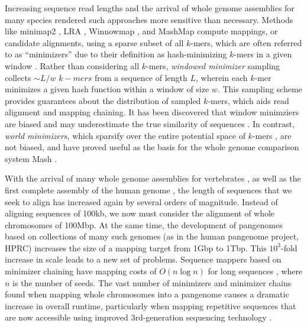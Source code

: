 \documentclass{bioinfo}
\theoremstyle{definition}
\begin{document}
Increasing sequence read lengths and the arrival of whole genome assemblies for many species rendered such approaches more sensitive than necessary.
Methods like minimap2 \citep{Li_2018}, LRA \citep{Ren_2021}, Winnowmap \citep{Jain_2020}, and MashMap \citep{Jain_2018} compute mappings, or candidate alignments, using a sparse subset of all $k$-mers, which are often referred to as ``minimizers'' due to their definition as hash-minimizing $k$-mers in a given window \cite{Roberts_2004}.
Rather than considering all $k$-mers, \textit{windowed minimizer} sampling collects $\sim L/w$ $k-mers$ from a sequence of length $L$, wherein each $k$-mer minimizes a given hash function within a window of size $w$.
This sampling scheme provides guarantees about the distribution of sampled $k$-mers, which aids read alignment and mapping chaining.
It has been discovered that window minimziers are biased and may underestimate the true similarity of sequences \citep{Belbasi_2022}.
In contrast, \textit{world minimizers}, which sparsify over the entire potential space of $k$-mers \citep{Broder_1997}, are not biased, and have proved useful as the basis for the whole genome comparison system Mash \citep{Ondov_2016}.

With the arrival of many whole genome assemblies for vertebrates \citep{Rhie_2021}, as well as the first complete assembly of the human genome \cite{Nurk_2022}, the length of sequences that we seek to align has increased again by several orders of magnitude.
Instead of aligning sequences of 100kb, we now must consider the alignment of whole chromosomes of 100Mbp.
At the same time, the development of pangenomes based on collections of many such genomes (as in the human pangenome project, HPRC) increases the size of a mapping target from 1Gbp to 1Tbp.
This $10^3$-fold increase in scale leads to a new set of problems. %
Sequence mappers based on minimizer chaining have mapping costs of $O(n \log n)$ for long sequences \citep{Jain_2022}, where $n$ is the number of seeds.
The vast number of minimizers and minimizer chains found when mapping whole chromosomes into a pangenome causes a dramatic increase in overall runtime, particularly when mapping repetitive sequences that are now accessible using improved 3rd-generation sequencing technology \citep{Logsdon_2021,Nurk_2022}.

\end{document}
